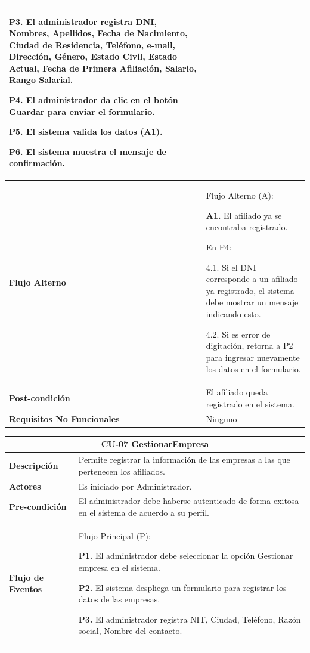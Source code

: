 \documentclass[12pt,a4paper]{article}
\begin{document}
\begin{center}
\begin{tabular}{|m{5.5cm}| m{9.5cm}|}
\textbf{P3.} El administrador registra DNI, Nombres, Apellidos, Fecha de Nacimiento, Ciudad de Residencia, Teléfono, e-mail, Dirección, Género, Estado Civil, Estado Actual, Fecha de Primera Afiliación, Salario, Rango Salarial.

\textbf{P4.} El administrador da clic en el botón Guardar para enviar el formulario.

\textbf{P5.} El sistema valida los datos (A1).

\textbf{P6.} El sistema muestra el mensaje de confirmación.
\\
\hline 
\textbf{Flujo Alterno} &  Flujo Alterno (A):

\textbf{A1.} El afiliado ya se encontraba registrado.

	En P4:
	
	4.1. Si el DNI corresponde a un afiliado ya registrado, el sistema debe mostrar un mensaje indicando esto.
	
	4.2. Si es error de digitación, retorna a P2 para ingresar nuevamente los datos en el formulario. \\ 
\hline 
\textbf{Post-condición}  & El afiliado queda registrado en el sistema. \\ 
\hline 
\textbf{Requisitos No Funcionales} & Ninguno \\ 
\hline 
\end{tabular}
\vspace{5mm}

\begin{tabular}{|m{5.5cm}| m{9.5cm}|}
\hline 
\multicolumn{2}{|c|}{\textbf{CU-07 GestionarEmpresa}} \\ 
\hline 
\textbf{Descripción} & Permite registrar la información de las empresas a las que pertenecen los afiliados. \\ 
\hline 
\textbf{Actores} & Es iniciado por Administrador. \\ 
\hline 
\textbf{Pre-condición} & El administrador debe haberse autenticado de forma exitosa en el sistema de acuerdo a su perfil. \\ 
\hline 
\textbf{Flujo de Eventos} & Flujo Principal (P):

\textbf{P1.} El administrador debe seleccionar la opción Gestionar empresa en el sistema.

\textbf{P2.} El sistema despliega un formulario para registrar los datos de las empresas.

\textbf{P3.} El administrador registra NIT, Ciudad, Teléfono, Razón social, Nombre del contacto.


\end{tabular}
\end{center}
\end{document}
